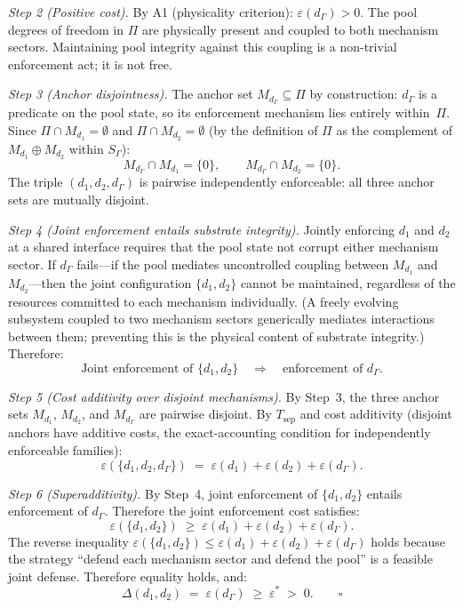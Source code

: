 \documentclass[11pt]{article}
\theoremstyle{remark}
\begin{document}
\begin{tcolorbox}[apfbox, title={$L_{\Delta}$ (Competition): Superadditivity from Substrate Integrity}]
\textit{Step 2 (Positive cost).}  By A1 (physicality criterion): $\varepsilon(d_\Gamma) > 0$.  The pool degrees of freedom in $\Pi$ are physically present and coupled to both mechanism sectors.  Maintaining pool integrity against this coupling is a non-trivial enforcement act; it is not free.

\textit{Step 3 (Anchor disjointness).}  The anchor set $M_{d_\Gamma} \subseteq \Pi$ by construction: $d_\Gamma$ is a predicate on the pool state, so its enforcement mechanism lies entirely within~$\Pi$.  Since $\Pi \cap M_{d_1} = \emptyset$ and $\Pi \cap M_{d_2} = \emptyset$ (by the definition of $\Pi$ as the complement of $M_{d_1} \oplus M_{d_2}$ within $S_\Gamma$):
\[
M_{d_\Gamma} \cap M_{d_1} = \{0\}, \qquad M_{d_\Gamma} \cap M_{d_2} = \{0\}.
\]
The triple $(d_1, d_2, d_\Gamma)$ is pairwise independently enforceable: all three anchor sets are mutually disjoint.

\textit{Step 4 (Joint enforcement entails substrate integrity).}  Jointly enforcing $d_1$ and $d_2$ at a shared interface requires that the pool state not corrupt either mechanism sector.  If $d_\Gamma$ fails---if the pool mediates uncontrolled coupling between $M_{d_1}$ and $M_{d_2}$---then the joint configuration $\{d_1, d_2\}$ cannot be maintained, regardless of the resources committed to each mechanism individually.  (A freely evolving subsystem coupled to two mechanism sectors generically mediates interactions between them; preventing this is the physical content of substrate integrity.)  Therefore:
\[
\text{Joint enforcement of } \{d_1, d_2\} \quad\Longrightarrow\quad \text{enforcement of } d_\Gamma.
\]

\textit{Step 5 (Cost additivity over disjoint mechanisms).}  By Step~3, the three anchor sets $M_{d_1}$, $M_{d_2}$, and $M_{d_\Gamma}$ are pairwise disjoint.  By $T_{\mathrm{sep}}$ and cost additivity (disjoint anchors have additive costs, the exact-accounting condition for independently enforceable families):
\[
\varepsilon(\{d_1, d_2, d_\Gamma\}) \;=\; \varepsilon(d_1) + \varepsilon(d_2) + \varepsilon(d_\Gamma).
\]

\textit{Step 6 (Superadditivity).}  By Step~4, joint enforcement of $\{d_1, d_2\}$ entails enforcement of $d_\Gamma$.  Therefore the joint enforcement cost satisfies:
\[
\varepsilon(\{d_1, d_2\}) \;\ge\; \varepsilon(d_1) + \varepsilon(d_2) + \varepsilon(d_\Gamma).
\]
The reverse inequality $\varepsilon(\{d_1,d_2\}) \le \varepsilon(d_1) + \varepsilon(d_2) + \varepsilon(d_\Gamma)$ holds because the strategy ``defend each mechanism sector and defend the pool'' is a feasible joint defense.  Therefore equality holds, and:
\begin{equation}
\Delta(d_1, d_2) \;=\; \varepsilon(d_\Gamma) \;\ge\; \varepsilon^* \;>\; 0. \qquad\square
\end{equation}


\end{tcolorbox}
\end{document}
